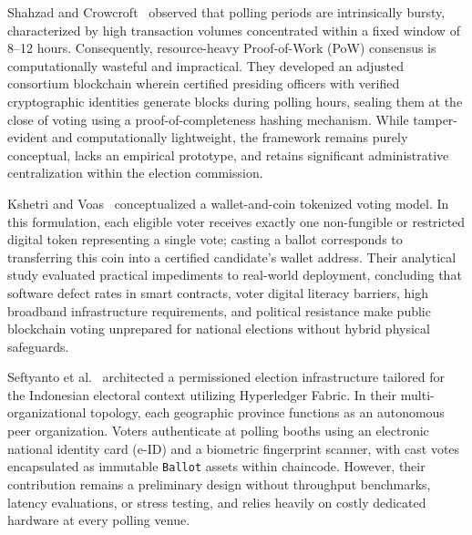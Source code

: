 \documentclass[12pt,a4paper]{report}
\begin{document}
Shahzad and Crowcroft~\cite{Shahzad2019} observed that polling periods are intrinsically bursty, characterized by high transaction volumes concentrated within a fixed window of 8--12 hours. Consequently, resource-heavy Proof-of-Work (PoW) consensus is computationally wasteful and impractical. They developed an adjusted consortium blockchain wherein certified presiding officers with verified cryptographic identities generate blocks during polling hours, sealing them at the close of voting using a proof-of-completeness hashing mechanism. While tamper-evident and computationally lightweight, the framework remains purely conceptual, lacks an empirical prototype, and retains significant administrative centralization within the election commission.

Kshetri and Voas~\cite{Kshetri2018} conceptualized a wallet-and-coin tokenized voting model. In this formulation, each eligible voter receives exactly one non-fungible or restricted digital token representing a single vote; casting a ballot corresponds to transferring this coin into a certified candidate's wallet address. Their analytical study evaluated practical impediments to real-world deployment, concluding that software defect rates in smart contracts, voter digital literacy barriers, high broadband infrastructure requirements, and political resistance make public blockchain voting unprepared for national elections without hybrid physical safeguards.

Seftyanto et al.~\cite{Seftyanto2019} architected a permissioned election infrastructure tailored for the Indonesian electoral context utilizing Hyperledger Fabric. In their multi-organizational topology, each geographic province functions as an autonomous peer organization. Voters authenticate at polling booths using an electronic national identity card (e-ID) and a biometric fingerprint scanner, with cast votes encapsulated as immutable \texttt{Ballot} assets within chaincode. However, their contribution remains a preliminary design without throughput benchmarks, latency evaluations, or stress testing, and relies heavily on costly dedicated hardware at every polling venue.
\end{document}
